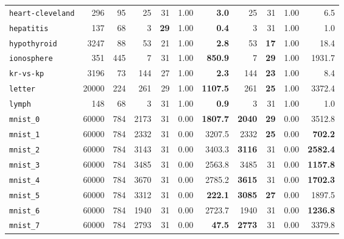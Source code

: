 \begin{tabular}{lccrrrrrrrr}
\texttt{heart-cleveland} & \multicolumn{1}{r}{296} & \multicolumn{1}{r}{95}  & 25 & 31 & 1.00 & \textbf{3.0} & 25 & 31 & 1.00 & 6.5\\
\texttt{hepatitis} & \multicolumn{1}{r}{137} & \multicolumn{1}{r}{68}  & 3 & \textbf{29} & 1.00 & \textbf{0.4} & 3 & 31 & 1.00 & 1.0\\
\texttt{hypothyroid} & \multicolumn{1}{r}{3247} & \multicolumn{1}{r}{88}  & 53 & 21 & 1.00 & \textbf{2.8} & 53 & \textbf{17} & 1.00 & 18.4\\
\texttt{ionosphere} & \multicolumn{1}{r}{351} & \multicolumn{1}{r}{445}  & 7 & 31 & 1.00 & \textbf{850.9} & 7 & \textbf{29} & 1.00 & 1931.7\\
\texttt{kr-vs-kp} & \multicolumn{1}{r}{3196} & \multicolumn{1}{r}{73}  & 144 & 27 & 1.00 & \textbf{2.3} & 144 & \textbf{23} & 1.00 & 8.4\\
\texttt{letter} & \multicolumn{1}{r}{20000} & \multicolumn{1}{r}{224}  & 261 & 29 & 1.00 & \textbf{1107.5} & 261 & \textbf{25} & 1.00 & 3372.4\\
\texttt{lymph} & \multicolumn{1}{r}{148} & \multicolumn{1}{r}{68}  & 3 & 31 & 1.00 & \textbf{0.9} & 3 & 31 & 1.00 & 1.0\\
\texttt{mnist\_0} & \multicolumn{1}{r}{60000} & \multicolumn{1}{r}{784}  & 2173 & 31 & 0.00 & \textbf{1807.7} & \textbf{2040} & \textbf{29} & 0.00 & 3512.8\\
\texttt{mnist\_1} & \multicolumn{1}{r}{60000} & \multicolumn{1}{r}{784}  & 2332 & 31 & 0.00 & 3207.5 & 2332 & \textbf{25} & 0.00 & \textbf{702.2}\\
\texttt{mnist\_2} & \multicolumn{1}{r}{60000} & \multicolumn{1}{r}{784}  & 3143 & 31 & 0.00 & 3403.3 & \textbf{3116} & 31 & 0.00 & \textbf{2582.4}\\
\texttt{mnist\_3} & \multicolumn{1}{r}{60000} & \multicolumn{1}{r}{784}  & 3485 & 31 & 0.00 & 2563.8 & 3485 & 31 & 0.00 & \textbf{1157.8}\\
\texttt{mnist\_4} & \multicolumn{1}{r}{60000} & \multicolumn{1}{r}{784}  & 3670 & 31 & 0.00 & 2785.2 & \textbf{3615} & 31 & 0.00 & \textbf{1702.3}\\
\texttt{mnist\_5} & \multicolumn{1}{r}{60000} & \multicolumn{1}{r}{784}  & 3312 & 31 & 0.00 & \textbf{222.1} & \textbf{3085} & \textbf{27} & 0.00 & 1897.5\\
\texttt{mnist\_6} & \multicolumn{1}{r}{60000} & \multicolumn{1}{r}{784}  & 1940 & 31 & 0.00 & 2723.7 & 1940 & 31 & 0.00 & \textbf{1236.8}\\
\texttt{mnist\_7} & \multicolumn{1}{r}{60000} & \multicolumn{1}{r}{784}  & 2793 & 31 & 0.00 & \textbf{47.5} & \textbf{2773} & 31 & 0.00 & 3379.8\\

\end{tabular}
